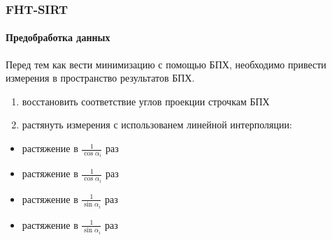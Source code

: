 \documentclass[12pt]{beamer}
\newcommand{\rom}[1]{%
  \textup{\uppercase\expandafter{\romannumeral#1}}%
}
\begin{document}
\begin{frame}
\frametitle{FHT-SIRT}
\framesubtitle{Предобработка данных}

Перед тем как вести минимизацию с помощью БПХ, необходимо привести измерения в пространство результатов БПХ.
\begin{enumerate}
  \item восстановить соответствие углов проекции строчкам БПХ
  \item растянуть измерения с использованем линейной интерполяции:
\end{enumerate}

\hspace*{2cm}
  \begin{itemize}
    \item \rom{1} растяжение в $\frac 1 {\cos \alpha_i}$ раз
    \item \rom{2} растяжение в $\frac 1 {\cos \alpha_i}$ раз
    \item \rom{3} растяжение в $\frac 1 {\sin \alpha_i}$ раз
    \item \rom{4} растяжение в $\frac 1 {\sin \alpha_i}$ раз
  \end{itemize}

\end{frame}
\end{document}
